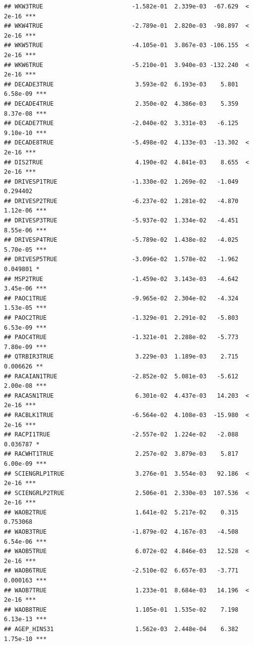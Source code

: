 \documentclass[
]{article}
\begin{document}
\begin{verbatim}
## WKW3TRUE                         -1.582e-01  2.339e-03  -67.629  < 2e-16 ***
## WKW4TRUE                         -2.789e-01  2.820e-03  -98.897  < 2e-16 ***
## WKW5TRUE                         -4.105e-01  3.867e-03 -106.155  < 2e-16 ***
## WKW6TRUE                         -5.210e-01  3.940e-03 -132.240  < 2e-16 ***
## DECADE3TRUE                       3.593e-02  6.193e-03    5.801 6.58e-09 ***
## DECADE4TRUE                       2.350e-02  4.386e-03    5.359 8.37e-08 ***
## DECADE7TRUE                      -2.040e-02  3.331e-03   -6.125 9.10e-10 ***
## DECADE8TRUE                      -5.498e-02  4.133e-03  -13.302  < 2e-16 ***
## DIS2TRUE                          4.190e-02  4.841e-03    8.655  < 2e-16 ***
## DRIVESP1TRUE                     -1.330e-02  1.269e-02   -1.049 0.294402    
## DRIVESP2TRUE                     -6.237e-02  1.281e-02   -4.870 1.12e-06 ***
## DRIVESP3TRUE                     -5.937e-02  1.334e-02   -4.451 8.55e-06 ***
## DRIVESP4TRUE                     -5.789e-02  1.438e-02   -4.025 5.70e-05 ***
## DRIVESP5TRUE                     -3.096e-02  1.578e-02   -1.962 0.049801 *  
## MSP2TRUE                         -1.459e-02  3.143e-03   -4.642 3.45e-06 ***
## PAOC1TRUE                        -9.965e-02  2.304e-02   -4.324 1.53e-05 ***
## PAOC2TRUE                        -1.329e-01  2.291e-02   -5.803 6.53e-09 ***
## PAOC4TRUE                        -1.321e-01  2.288e-02   -5.773 7.80e-09 ***
## QTRBIR3TRUE                       3.229e-03  1.189e-03    2.715 0.006626 ** 
## RACAIAN1TRUE                     -2.852e-02  5.081e-03   -5.612 2.00e-08 ***
## RACASN1TRUE                       6.301e-02  4.437e-03   14.203  < 2e-16 ***
## RACBLK1TRUE                      -6.564e-02  4.108e-03  -15.980  < 2e-16 ***
## RACPI1TRUE                       -2.557e-02  1.224e-02   -2.088 0.036787 *  
## RACWHT1TRUE                       2.257e-02  3.879e-03    5.817 6.00e-09 ***
## SCIENGRLP1TRUE                    3.276e-01  3.554e-03   92.186  < 2e-16 ***
## SCIENGRLP2TRUE                    2.506e-01  2.330e-03  107.536  < 2e-16 ***
## WAOB2TRUE                         1.641e-02  5.217e-02    0.315 0.753068    
## WAOB3TRUE                        -1.879e-02  4.167e-03   -4.508 6.54e-06 ***
## WAOB5TRUE                         6.072e-02  4.846e-03   12.528  < 2e-16 ***
## WAOB6TRUE                        -2.510e-02  6.657e-03   -3.771 0.000163 ***
## WAOB7TRUE                         1.233e-01  8.684e-03   14.196  < 2e-16 ***
## WAOB8TRUE                         1.105e-01  1.535e-02    7.198 6.13e-13 ***
## AGEP_HINS31                       1.562e-03  2.448e-04    6.382 1.75e-10 ***

\end{verbatim}
\end{document}
